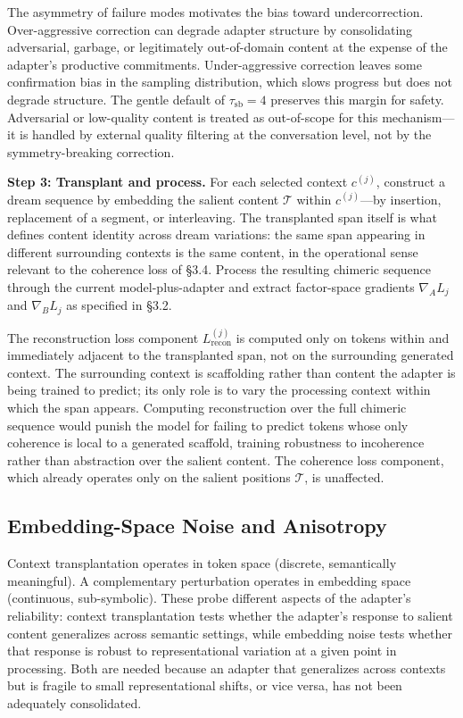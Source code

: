 \documentclass[11pt]{article}
\begin{document}
The asymmetry of failure modes motivates the bias toward undercorrection. Over-aggressive correction can degrade adapter structure by consolidating adversarial, garbage, or legitimately out-of-domain content at the expense of the adapter's productive commitments. Under-aggressive correction leaves some confirmation bias in the sampling distribution, which slows progress but does not degrade structure. The gentle default of $\tau_{\text{sb}} = 4$ preserves this margin for safety. Adversarial or low-quality content is treated as out-of-scope for this mechanism---it is handled by external quality filtering at the conversation level, not by the symmetry-breaking correction.

\medskip
\noindent\textbf{Step 3: Transplant and process.} For each selected context $c^{(j)}$, construct a dream sequence by embedding the salient content $\mathcal{T}$ within $c^{(j)}$---by insertion, replacement of a segment, or interleaving. The transplanted span itself is what defines content identity across dream variations: the same span appearing in different surrounding contexts is the same content, in the operational sense relevant to the coherence loss of \S 3.4. Process the resulting chimeric sequence through the current model-plus-adapter and extract factor-space gradients $\nabla_A L_j$ and $\nabla_B L_j$ as specified in \S 3.2.

The reconstruction loss component $L_\text{recon}^{(j)}$ is computed only on tokens within and immediately adjacent to the transplanted span, not on the surrounding generated context. The surrounding context is scaffolding rather than content the adapter is being trained to predict; its only role is to vary the processing context within which the span appears. Computing reconstruction over the full chimeric sequence would punish the model for failing to predict tokens whose only coherence is local to a generated scaffold, training robustness to incoherence rather than abstraction over the salient content. The coherence loss component, which already operates only on the salient positions $\mathcal{T}$, is unaffected.

\subsection{Embedding-Space Noise and Anisotropy}

Context transplantation operates in token space (discrete, semantically meaningful). A complementary perturbation operates in embedding space (continuous, sub-symbolic). These probe different aspects of the adapter's reliability: context transplantation tests whether the adapter's response to salient content generalizes across semantic settings, while embedding noise tests whether that response is robust to representational variation at a given point in processing. Both are needed because an adapter that generalizes across contexts but is fragile to small representational shifts, or vice versa, has not been adequately consolidated.
\end{document}
